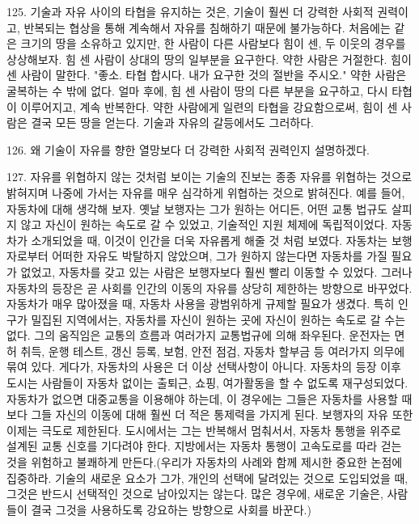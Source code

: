 \documentclass[11pt,a4paper]{article}
\begin{document}
\begin{multicols}{2}
125. 기술과 자유 사이의 타협을 유지하는 것은, 기술이 훨씬 더 강력한 사회적 권력이고, 반복되는  협상을 통해 계속해서 자유를 침해하기 때문에 불가능하다. 처음에는 같은 크기의 땅을 소유하고 있지만,  한 사람이 다른 사람보다 힘이 센, 두 이웃의 경우를 상상해보자. 힘 센 사람이 상대의 땅의 일부분을  요구한다. 약한 사람은 거절한다. 힘이 센 사람이 말한다. "좋소. 타협 합시다. 내가 요구한 것의 절반을  주시오." 약한 사람은 굴복하는 수 밖에 없다. 얼마 후에, 힘 센 사람이 땅의 다른 부분을 요구하고, 다시  타협이 이루어지고, 계속 반복한다. 약한 사람에게 일련의 타협을 강요함으로써, 힘이 센 사람은 결국  모든 땅을 얻는다. 기술과 자유의 갈등에서도 그러하다.  


126. 왜 기술이 자유를 향한 열망보다 더 강력한 사회적 권력인지 설명하겠다. 


127. 자유를 위협하지 않는 것처럼 보이는 기술의 진보는 종종 자유를 위협하는 것으로 밝혀지며 나중에  가서는 자유를 매우 심각하게 위협하는 것으로 밝혀진다. 예를 들어, 자동차에 대해 생각해 보자. 옛날  보행자는 그가 원하는 어디든, 어떤 교통 법규도 살피지 않고 자신이 원하는 속도로 갈 수 있었고,  기술적인 지원 체제에 독립적이었다. 자동차가 소개되었을 때, 이것이 인간을 더욱 자유롭게 해줄 것 처럼 보였다. 자동차는 보행자로부터 어떠한 자유도 박탈하지 않았으며, 그가 원하지 않는다면 자동차를 가질  필요가 없었고, 자동차를 갖고 있는 사람은 보행자보다 훨씬 빨리 이동할 수 있었다. 그러나 자동차의  등장은 곧 사회를 인간의 이동의 자유를 상당히 제한하는 방향으로 바꾸었다. 자동차가 매우 많아졌을 때, 자동차 사용을 광범위하게 규제할 필요가 생겼다. 특히 인구가 밀집된 지역에서는, 자동차를 자신이  원하는 곳에 자신이 원하는 속도로 갈 수는 없다. 그의 움직임은 교통의 흐름과 여러가지 교통법규에 의해 좌우된다. 운전자는 면허 취득, 운행 테스트, 갱신 등록, 보험, 안전 점검, 자동차 할부금 등 여러가지  의무에 묶여 있다. 게다가, 자동차의 사용은 더 이상 선택사항이 아니다. 자동차의 등장 이후 도시는  사람들이 자동차 없이는 출퇴근, 쇼핑, 여가활동을 할 수 없도록 재구성되었다. 자동차가 없으면  대중교통을 이용해야 하는데, 이 경우에는 그들은 자동차를 사용할 때보다 그들 자신의 이동에 대해 훨씬  더 적은 통제력을 가지게 된다. 보행자의 자유 또한 이제는 극도로 제한된다. 도시에서는 그는 반복해서  멈춰서서, 자동차 통행을 위주로 설계된 교통 신호를 기다려야 한다. 지방에서는 자동차 통행이  고속도로를 따라 걷는 것을 위험하고 불쾌하게 만든다.(우리가 자동차의 사례와 함께 제시한 중요한  논점에 집중하라. 기술의 새로운 요소가 그가, 개인의 선택에 달려있는 것으로 도입되었을 때, 그것은  반드시 선택적인 것으로 남아있지는 않는다. 많은 경우에, 새로운 기술은, 사람들이 결국 그것을  사용하도록 강요하는 방향으로 사회를 바꾼다.) 



\end{multicols}
\end{document}
